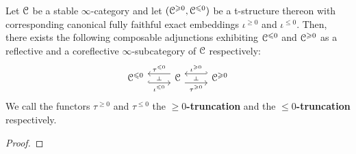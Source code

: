            \begin{proposition} \label{prop: t_structures_and_localisations}
                Let $\mathcal{C}$ be a stable $\infty$-category and let $(\mathcal{C}^{\geqslant 0}, \mathcal{C}^{\leqslant 0})$ be a t-structure thereon with corresponding canonical fully faithful exact embeddings $\iota^{\geq 0}$ and $\iota^{\leq 0}$. Then, there exists the following composable adjunctions exhibiting $\mathcal{C}^{\leqslant 0}$ and $\mathcal{C}^{\geqslant 0}$ as a reflective and a coreflective $\infty$-subcategory of $\mathcal{C}$ respectively:
                    $$
                        \begin{tikzcd}
                            {\C^{\leq 0}} & \C & {\C^{\geq 0}}
                            \arrow[""{name=0, anchor=center, inner sep=0}, "{\iota^{\leq 0}}"', shift right=2, hook, from=1-1, to=1-2]
                            \arrow[""{name=1, anchor=center, inner sep=0}, "{\tau^{\leq 0}}"', shift right=2, from=1-2, to=1-1]
                            \arrow[""{name=2, anchor=center, inner sep=0}, "{\tau^{\geq 0}}"', shift right=2, from=1-2, to=1-3]
                            \arrow[""{name=3, anchor=center, inner sep=0}, "{\iota^{\geq 0}}"', shift right=2, hook', from=1-3, to=1-2]
                            \arrow["\dashv"{anchor=center, rotate=-90}, draw=none, from=1, to=0]
                            \arrow["\dashv"{anchor=center, rotate=-90}, draw=none, from=3, to=2]
                        \end{tikzcd}
                    $$
                We call the functors $\tau^{\geq 0}$ and $\tau^{\leq 0}$ the \textbf{$\geq 0$-truncation} and the \textbf{$\leq 0$-truncation} respectively.
            \end{proposition}
                \begin{proof}
                    
                \end{proof}
